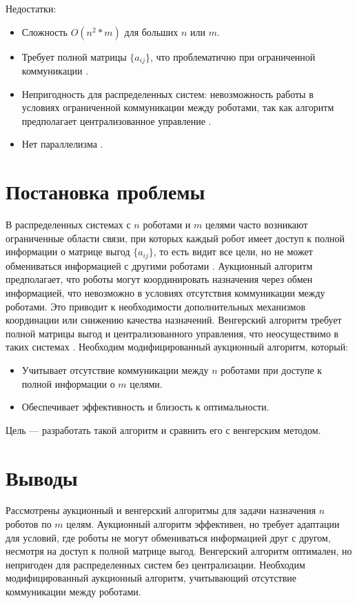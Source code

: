 Недостатки:
\begin{itemize}
    \item Сложность \( O(n^2*m) \) для больших \( n \) или \( m \).
    \item Требует полной матрицы \( \{a_{ij}\} \), что проблематично при ограниченной коммуникации \cite{gerkey2003}.
    \item Непригодность для распределенных систем: невозможность работы в условиях ограниченной коммуникации между роботами, так как алгоритм предполагает централизованное управление \cite{kalyaev2009}.
    \item Нет параллелизма \cite{bertsekas1989}.
\end{itemize}

\section{Постановка проблемы}
В распределенных системах с \( n \) роботами и \( m \) целями часто возникают ограниченные области связи, при которых каждый робот имеет доступ к полной информации о матрице выгод \( \{a_{ij}\} \), то есть видит все цели, но не может обмениваться информацией с другими роботами \cite{gerkey2003, kalyaev2009}. Аукционный алгоритм \cite{bertsekas1990} предполагает, что роботы могут координировать назначения через обмен информацией, что невозможно в условиях отсутствия коммуникации между роботами. Это приводит к необходимости дополнительных механизмов координации или снижению качества назначений. Венгерский алгоритм \cite{kuhn1955, emaxx2025} требует полной матрицы выгод и централизованного управления, что неосуществимо в таких системах \cite{kalyaev2009}. Необходим модифицированный аукционный алгоритм, который:

\begin{itemize}
    \item Учитывает отсутствие коммуникации между \( n \) роботами при доступе к полной информации о \( m \) целями.
    \item Обеспечивает эффективность и близость к оптимальности.
\end{itemize}

Цель --- разработать такой алгоритм и сравнить его с венгерским методом.

\section{Выводы}
Рассмотрены аукционный \cite{bertsekas1990} и венгерский \cite{kuhn1955, emaxx2025} алгоритмы для задачи назначения \( n \) роботов по \( m \) целям. Аукционный алгоритм эффективен, но требует адаптации для условий, где роботы не могут обмениваться информацией друг с другом, несмотря на доступ к полной матрице выгод. Венгерский алгоритм оптимален, но непригоден для распределенных систем без централизации. Необходим модифицированный аукционный алгоритм, учитывающий отсутствие коммуникации между роботами.


